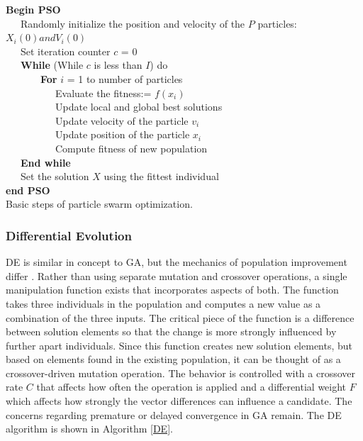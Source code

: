 \documentclass{tamuccthesis}
\begin{document}
\begin{algorithm}%
\textbf{Begin PSO}\\
~~~Randomly initialize the position and velocity of the $P$ particles: $X_i(0) and V_i(0)$\\
~~~Set iteration counter $c$ = 0 \\
~~~\textbf{While} (While $c$ is less than $I$) do\\
~~~~~~~\textbf{For} $i$ = 1 to number of particles \\
 ~~~~~~~~~~Evaluate the fitness:= $ f(x_i)$\\
 ~~~~~~~~~~Update local and global best solutions \\ 
 ~~~~~~~~~~Update velocity of the particle $v_i$\\
 ~~~~~~~~~~Update position of the particle $x_i$\\
 ~~~~~~~~~~Compute fitness of new population\\
~~~\textbf{End while} \\
~~~Set the solution $X$ using the fittest individual \\
\textbf{end PSO}\\
\caption[Basic steps of particle swarm optimization.]{Basic steps of particle swarm optimization.} 
\label{PSO}
\end{algorithm}

\subsubsection{Differential Evolution }

DE is similar in concept to GA, but the mechanics of population improvement differ \cite{de:zhang:2013}. Rather than using separate mutation and crossover operations, a single manipulation function exists that incorporates aspects of both. The function takes three individuals in the population and computes a new value as a combination of the three inputs. The critical piece of the function is a difference between solution elements so that the change is more strongly influenced by further apart individuals. Since this function creates new solution elements, but based on elements found in the existing population, it can be thought of as a crossover-driven mutation operation. The behavior is controlled with a crossover rate $C$ that affects how often the operation is applied and a differential weight $F$ which affects how strongly the vector differences can influence a candidate. The concerns regarding premature or delayed convergence in GA remain. The DE algorithm is shown in Algorithm \ref{DE}.
\end{document}
